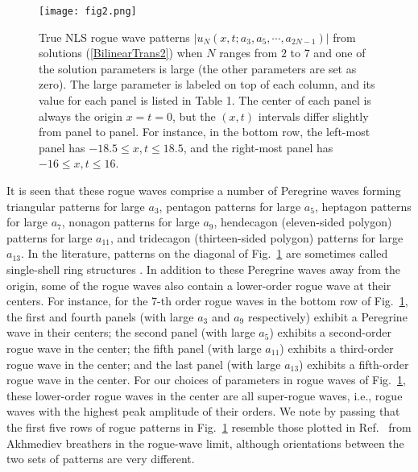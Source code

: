\documentclass[amsmath,amssymb]{revtex4}
\begin{document}
\begin{figure}[htb]
\begin{center}
\texttt{[image: fig2.png]}
\caption{True NLS rogue wave patterns $|u_N(x,t; a_{3}, a_{5}, \cdots, a_{2N-1})|$ from solutions (\ref{BilinearTrans2}) when $N$ ranges from $2$ to $7$ and one of the solution parameters is large (the other parameters are set as zero). The large parameter is labeled on top of each column, and its value for each panel is listed in Table 1. The center of each panel is always the origin $x=t=0$, but the $(x,t)$ intervals differ slightly from panel to panel. For instance, in the bottom row, the left-most panel has $-18.5 \le x, t \le 18.5$, and the right-most panel has $-16 \le x, t \le 16$. } \label{f:bigTrue}
\end{center}
\end{figure}

It is seen that these rogue waves comprise a number of Peregrine waves forming triangular patterns for large $a_3$, pentagon patterns for large $a_5$, heptagon patterns for large $a_7$, nonagon patterns for large $a_9$, hendecagon (eleven-sided polygon) patterns for large $a_{11}$, and tridecagon (thirteen-sided polygon) patterns for large $a_{13}$. In the literature, patterns on the diagonal of Fig.~\ref{f:bigTrue} are sometimes called single-shell ring structures \cite{KAAN2011}. In addition to these Peregrine waves away from the origin, some of the rogue waves also contain a lower-order rogue wave at their centers. For instance, for the 7-th order rogue waves in the bottom row of Fig.~\ref{f:bigTrue}, the first and fourth panels (with large $a_3$ and $a_9$ respectively) exhibit a Peregrine wave in their centers; the second panel (with large $a_5$) exhibits a second-order rogue wave in the center; the fifth panel (with large $a_{11}$) exhibits a third-order rogue wave in the center; and the last panel (with large $a_{13}$) exhibits a fifth-order rogue wave in the center. For our choices of parameters in rogue waves of Fig.~\ref{f:bigTrue}, these lower-order rogue waves in the center are all super-rogue waves, i.e., rogue waves with the highest peak amplitude of their orders. We note by passing that the first five rows of rogue patterns in Fig.~\ref{f:bigTrue} resemble those plotted in Ref.~\cite{KAAN2013} from Akhmediev breathers in the rogue-wave limit, although orientations between the two sets of patterns are very different.
\end{document}
